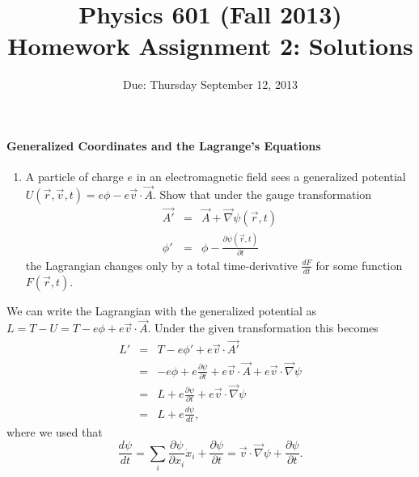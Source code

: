 \documentclass[letterpaper,11pt]{article}
\title{Physics 601 (Fall 2013) \\ Homework Assignment 2: Solutions}
\date{Due: Thursday September 12, 2013}
\begin{document}
\maketitle

\paragraph*{Generalized Coordinates and the Lagrange's Equations}
\begin{enumerate}
 \item A particle of charge $e$ in an electromagnetic field sees a generalized potential $U(\vec{r},\vec{v},t) = e \phi - e \vec{v} \cdot \vec{A}$.  Show that under the gauge transformation
  \begin{eqnarray*}
   \vec{A'} & = & \vec{A} + \vec{\nabla} \psi(\vec{r},t) \\
   \phi'    & = & \phi - \frac{\partial\psi(\vec{r},t)}{\partial t}
  \end{eqnarray*}
 the Lagrangian changes only by a total time-derivative $\frac{dF}{dt}$ for some function $F(\vec{r},t)$.
\end{enumerate}
We can write the Lagrangian with the generalized potential as $L = T - U = T - e \phi + e \vec{v} \cdot \vec{A}$.  Under the given transformation this becomes
\begin{eqnarray*}
 L' & = & T - e \phi' + e \vec{v} \cdot \vec{A'} \\
 & = &  - e \phi + e \frac{\partial\psi}{\partial t} + e \vec{v} \cdot \vec{A} + e \vec{v} \cdot \vec{\nabla} \psi \\
 & = & L + e \frac{\partial\psi}{\partial t} + e \vec{v} \cdot \vec{\nabla} \psi \\
 & = & L + e \frac{d\psi}{dt},
\end{eqnarray*}
where we used that
\begin{equation*}
 \frac{d\psi}{dt} = \sum_i \frac{\partial\psi}{\partial x_i} \dot{x}_i + \frac{\partial\psi}{\partial t} = \vec{v} \cdot \vec{\nabla} \psi + \frac{\partial\psi}{\partial t}.
\end{equation*}
\end{document}
